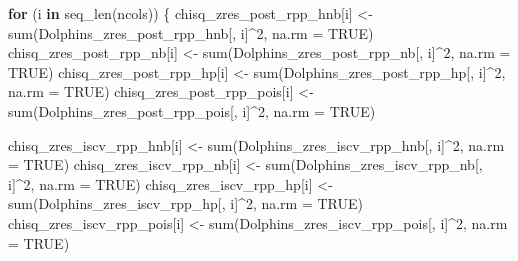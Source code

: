 \documentclass[
  english,
  letterpaper,
  DIV=11,
  numbers=noendperiod]{scrartcl}
\newenvironment{Shaded}{\begin{snugshade}}{\end{snugshade}}
\newcommand{\AttributeTok}[1]{\textcolor[rgb]{0.40,0.45,0.13}{#1}}
\newcommand{\ConstantTok}[1]{\textcolor[rgb]{0.56,0.35,0.01}{#1}}
\newcommand{\ControlFlowTok}[1]{\textcolor[rgb]{0.00,0.23,0.31}{\textbf{#1}}}
\newcommand{\DecValTok}[1]{\textcolor[rgb]{0.68,0.00,0.00}{#1}}
\newcommand{\FunctionTok}[1]{\textcolor[rgb]{0.28,0.35,0.67}{#1}}
\newcommand{\NormalTok}[1]{\textcolor[rgb]{0.00,0.23,0.31}{#1}}
\newcommand{\OtherTok}[1]{\textcolor[rgb]{0.00,0.23,0.31}{#1}}
\newcommand{\SpecialCharTok}[1]{\textcolor[rgb]{0.37,0.37,0.37}{#1}}
\begin{document}
\begin{Shaded}
\begin{Highlighting}[]
\ControlFlowTok{for}\NormalTok{ (i }\ControlFlowTok{in} \FunctionTok{seq\_len}\NormalTok{(ncols)) \{}
\NormalTok{  chisq\_zres\_post\_rpp\_hnb[i]  }\OtherTok{\textless{}{-}} \FunctionTok{sum}\NormalTok{(Dolphins\_zres\_post\_rpp\_hnb[,  i]}\SpecialCharTok{\^{}}\DecValTok{2}\NormalTok{, }\AttributeTok{na.rm =} \ConstantTok{TRUE}\NormalTok{)}
\NormalTok{  chisq\_zres\_post\_rpp\_nb[i]   }\OtherTok{\textless{}{-}} \FunctionTok{sum}\NormalTok{(Dolphins\_zres\_post\_rpp\_nb[,   i]}\SpecialCharTok{\^{}}\DecValTok{2}\NormalTok{, }\AttributeTok{na.rm =} \ConstantTok{TRUE}\NormalTok{)}
\NormalTok{  chisq\_zres\_post\_rpp\_hp[i]   }\OtherTok{\textless{}{-}} \FunctionTok{sum}\NormalTok{(Dolphins\_zres\_post\_rpp\_hp[,   i]}\SpecialCharTok{\^{}}\DecValTok{2}\NormalTok{, }\AttributeTok{na.rm =} \ConstantTok{TRUE}\NormalTok{)}
\NormalTok{  chisq\_zres\_post\_rpp\_pois[i] }\OtherTok{\textless{}{-}} \FunctionTok{sum}\NormalTok{(Dolphins\_zres\_post\_rpp\_pois[, i]}\SpecialCharTok{\^{}}\DecValTok{2}\NormalTok{, }\AttributeTok{na.rm =} \ConstantTok{TRUE}\NormalTok{)}
  
\NormalTok{  chisq\_zres\_iscv\_rpp\_hnb[i]  }\OtherTok{\textless{}{-}} \FunctionTok{sum}\NormalTok{(Dolphins\_zres\_iscv\_rpp\_hnb[,  i]}\SpecialCharTok{\^{}}\DecValTok{2}\NormalTok{, }\AttributeTok{na.rm =} \ConstantTok{TRUE}\NormalTok{)}
\NormalTok{  chisq\_zres\_iscv\_rpp\_nb[i]   }\OtherTok{\textless{}{-}} \FunctionTok{sum}\NormalTok{(Dolphins\_zres\_iscv\_rpp\_nb[,   i]}\SpecialCharTok{\^{}}\DecValTok{2}\NormalTok{, }\AttributeTok{na.rm =} \ConstantTok{TRUE}\NormalTok{)}
\NormalTok{  chisq\_zres\_iscv\_rpp\_hp[i]   }\OtherTok{\textless{}{-}} \FunctionTok{sum}\NormalTok{(Dolphins\_zres\_iscv\_rpp\_hp[,   i]}\SpecialCharTok{\^{}}\DecValTok{2}\NormalTok{, }\AttributeTok{na.rm =} \ConstantTok{TRUE}\NormalTok{)}
\NormalTok{  chisq\_zres\_iscv\_rpp\_pois[i] }\OtherTok{\textless{}{-}} \FunctionTok{sum}\NormalTok{(Dolphins\_zres\_iscv\_rpp\_pois[, i]}\SpecialCharTok{\^{}}\DecValTok{2}\NormalTok{, }\AttributeTok{na.rm =} \ConstantTok{TRUE}\NormalTok{)}
  

\end{Highlighting}
\end{Shaded}
\end{document}
